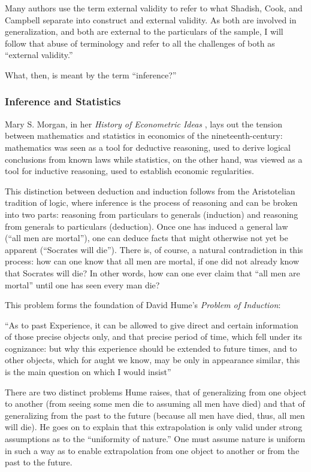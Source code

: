 \documentclass[a4paper,12pt]{article}
\begin{document}
Many authors use the term external validity to refer to what Shadish, Cook, and Campbell separate into construct and external validity. As both are involved in generalization, and both are external to the particulars of the sample, I will follow that abuse of terminology and refer to all the challenges of both as ``external validity.''

What, then, is meant by the term ``inference?''

\subsubsection{Inference and Statistics}

Mary S. Morgan, in her \textit{History of Econometric Ideas} \parencite*{Morgan1991}, lays out the tension between mathematics and statistics in economics of the nineteenth-century: mathematics was seen as a tool for deductive reasoning, used to derive logical conclusions from known laws while statistics, on the other hand, was viewed as a tool for inductive reasoning, used to establish economic regularities.

This distinction between deduction and induction follows from the Aristotelian tradition of logic, where inference is the process of reasoning and can be broken into two parts: reasoning from particulars to generals (induction) and reasoning from generals to particulars (deduction). Once one has induced a general law (``all men are mortal''), one can deduce facts that might otherwise not yet be apparent (``Socrates will die''). There is, of course, a natural contradiction in this process: how can one know that all men are mortal, if one did not already know that Socrates will die? In other words, how can one ever claim that ``all men are mortal'' until one has seen every man die?

This problem forms the foundation of David Hume's \textit{Problem of Induction}:

\begin{displayquote}
``As to past Experience, it can be allowed to give direct and certain information of those precise objects only, and that precise period of time, which fell under its cognizance: but why this experience should be extended to future times, and to other objects, which for aught we know, may be only in appearance similar, this is the main question on which I would insist'' \parencite{hume1748}
\end{displayquote}

There are two distinct problems Hume raises, that of generalizing from one object to another (from seeing some men die to assuming all men have died) and that of generalizing from the past to the future (because all men have died, thus, all men will die). He goes on to explain that this extrapolation is only valid under strong assumptions as to the ``uniformity of nature.'' One must assume nature is uniform in such a way as to enable extrapolation from one object to another or from the past to the future.
\end{document}
